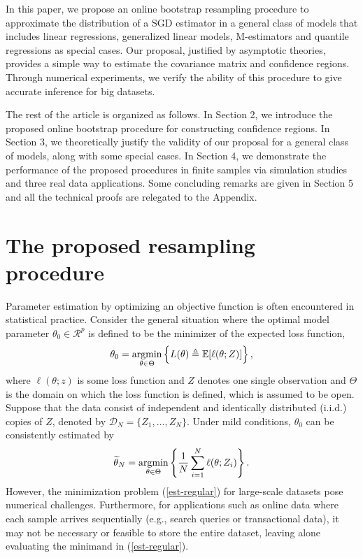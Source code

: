 \documentclass[twoside,11pt]{article}
\def\argmin{\mathop{\rm argmin}}
\def\wt{\widetilde}
\begin{document}
In this paper, we propose an online bootstrap resampling procedure to approximate the distribution of a SGD estimator in a general class of models that includes linear regressions, generalized linear models, M-estimators and quantile regressions as special cases. Our proposal, justified by asymptotic theories, provides a simple way to estimate the covariance matrix and confidence regions. Through numerical experiments, we verify the ability of this procedure to give accurate inference for big datasets.

The rest of the article is organized as follows. In Section 2,  we introduce the proposed online bootstrap procedure for constructing confidence regions. In Section 3, we theoretically justify the validity of our proposal for a general class of models, along with some special cases. In Section 4, we demonstrate the performance of the proposed procedures in finite samples via simulation studies and three real data applications. Some concluding remarks are given in Section 5 and all the technical proofs are relegated to the Appendix.




\section{The proposed resampling procedure}

Parameter estimation by optimizing an objective function is often encountered in statistical practice. Consider the general situation where the optimal model parameter $\theta_0\in \mathcal{R}^p$ is defined to be the minimizer of the expected loss function,
\begin{eqnarray}\label{theta-0}
{\theta}_0=\argmin_{\theta\in\Theta}\left\{L(\theta)\triangleq \mathbb{E}[\ell(\theta; Z)]\right\},
\end{eqnarray}
where $\ell(\theta; z)$ is some loss function and $Z$ denotes one single observation and $\Theta$ is the domain on which the loss function is defined, which is assumed to be open. Suppose that the data consist of independent and identically distributed (i.i.d.) copies of $Z$,  denoted by $\mathcal{D}_N=\{Z_1, \dots, Z_N\}$. Under mild conditions, $\theta_0$ can be consistently estimated by
\begin{eqnarray}\label{est-regular}
\wt{\theta}_N=\argmin_{\theta\in\Theta}\left\{\frac{1}{N}\sum_{i=1}^{N}\ell(\theta; Z_i)\right\}.
\end{eqnarray}
However, the minimization problem (\ref{est-regular}) for large-scale datasets pose numerical challenges. Furthermore, for applications such as online data where each sample arrives sequentially (e.g., search queries or transactional data), it may not be necessary or feasible to store the entire dataset, leaving alone evaluating the minimand in (\ref{est-regular}).
\end{document}
